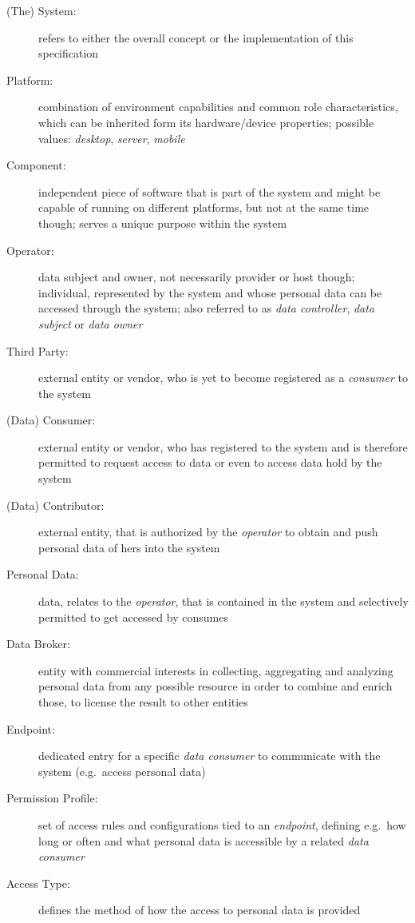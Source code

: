 \documentclass[12pt,english,a4paper,titlepage,cleardoublepage=empty,dottedtoc]{report}
\begin{document}
\begin{description}
\item[\protect\hypertarget{spec_term_system}{}{(The) System}:]
refers to either the overall concept or the implementation of this
specification
\item[\protect\hypertarget{spec_term_platform}{}{Platform}:]
combination of environment capabilities and common role characteristics,
which can be inherited form its hardware/device properties; possible
values: \emph{desktop}, \emph{server}, \emph{mobile}
\item[\protect\hypertarget{spec_term_component}{}{Component}:]
independent piece of software that is part of the system and might be
capable of running on different platforms, but not at the same time
though; serves a unique purpose within the system
\item[\protect\hypertarget{spec_term_operator}{}{Operator}:]
data subject and owner, not necessarily provider or host though;
individual, represented by the system and whose personal data can be
accessed through the system; also referred to as \emph{data controller},
\emph{data subject} or \emph{data owner}
\item[\protect\hypertarget{spec_term_third-party}{}{Third Party}:]
external entity or vendor, who is yet to become registered as a
\emph{consumer} to the system
\item[\protect\hypertarget{spec_term_consumer}{}{(Data) Consumer}:]
external entity or vendor, who has registered to the system and is
therefore permitted to request access to data or even to access data
hold by the system
\item[\protect\hypertarget{spec_term_contributor}{}{(Data)
Contributor}:]
external entity, that is authorized by the \emph{operator} to obtain and
push personal data of hers into the system
\item[\protect\hypertarget{spec_term_personal-data}{}{Personal Data}:]
data, relates to the \emph{operator}, that is contained in the system
and selectively permitted to get accessed by consumes
\item[\protect\hypertarget{spec_term_data-broker}{}{Data Broker}:]
entity with commercial interests in collecting, aggregating and
analyzing personal data from any possible resource in order to combine
and enrich those, to license the result to other entities
\item[\protect\hypertarget{spec_term_endpoint}{}{Endpoint}:]
dedicated entry for a specific \emph{data consumer} to communicate with
the system (e.g.~access personal data)
\item[\protect\hypertarget{spec_term_permission-profile}{}{Permission
Profile}:]
set of access rules and configurations tied to an \emph{endpoint},
defining e.g.~how long or often and what personal data is accessible by
a related \emph{data consumer}
\item[\protect\hypertarget{spec_term_access-type}{}{Access Type}:]
defines the method of how the access to personal data is provided
\end{description}
\end{document}
